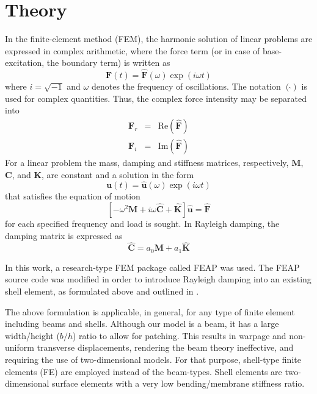 \documentclass{article}
\begin{document}
\section{Theory}
In the finite-element method (FEM), the harmonic solution of linear problems are expressed in complex arithmetic, where the force term (or in case of base-excitation, the boundary term) is written as
\begin{equation}
    \mathbf{F} (t) = \mathbf{\hat F} (\omega) \exp(i\omega t)
\end{equation}
where $i=\sqrt{-1}$ and $\omega$ denotes the frequency of oscillations. The notation $(\hat{})$ is used for complex quantities. Thus, the complex force intensity may be separated into 
\begin{eqnarray}
 \mathbf{F}_r & = & \mathrm{Re}(\mathbf{\hat F}) \\
 \mathbf{F}_i & = & \mathrm{Im}(\mathbf{\hat F})
\end{eqnarray}
For a linear problem the mass, damping and stiffness matrices, respectively, $\mathbf{M}$, $\mathbf{C}$, and $\mathbf{K}$, are constant and a solution in the form
\begin{equation}
    \mathbf{u}(t) = \mathbf{\hat u}(\omega)\exp(i\omega t)
\end{equation}
that satisfies the equation of motion
\begin{equation}
    \left[ -\omega^2 \mathbf{M} + i \omega \mathbf{\hat C} + \mathbf{\hat K} \right] \mathbf{\hat u} =  \mathbf{\hat F} \label{eqn:motion}
\end{equation}
for each specified frequency and load is sought. In Rayleigh damping, the damping matrix is expressed as
\begin{equation}
    \mathbf{\hat C} = a_0 \mathbf{M} + a_1 \mathbf{\hat K}
\end{equation}

In this work, a research-type FEM package called FEAP \cite{feap} was used. The FEAP source code was modified in order to introduce Rayleigh damping into an existing shell element, as formulated above and outlined in \cite{taylor07}.

The above formulation is applicable, in general, for any type of finite element including beams and shells. Although our model is a beam, it has a large width/height ($b/h$) ratio to allow for patching. This results in warpage and non-uniform transverse displacements, rendering the beam theory ineffective, and requiring the use of two-dimensional models.  For that purpose, shell-type finite elements (FE) are employed instead of the beam-types. Shell elements are two-dimensional surface elements with a very low bending/membrane stiffness ratio\cite{bischoff}. 
\end{document}
